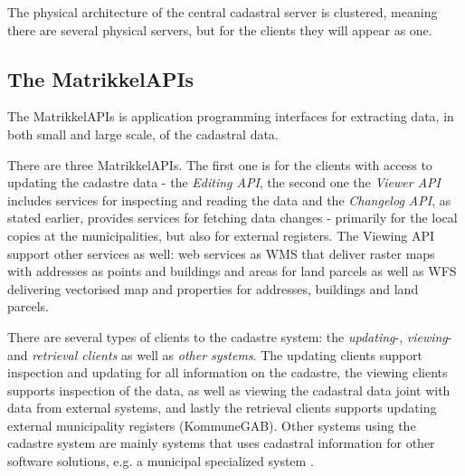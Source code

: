 The physical architecture of the central cadastral server is clustered, meaning there are several physical servers, but for the clients they will appear as one. %


\subsection{The MatrikkelAPIs} \label{matrikkelapi}
The MatrikkelAPIs is application programming interfaces for extracting data, in both small and large scale, of the cadastral data.  

There are three MatrikkelAPIs. The first one is for the clients with access to updating the cadastre data - the \textit{Editing API}, the second one the \textit{Viewer API} includes services for inspecting and reading the data and the \textit{Changelog API}, as stated earlier, provides services for fetching data changes - primarily for the local copies at the municipalities, but also for external registers.  The Viewing API support other services as well: web services as WMS that deliver raster maps with addresses as points and buildings and areas for land parcels as well as WFS delivering vectorised map	and properties for addresses, buildings and land parcels. 

There are several types of clients to the cadastre system: the \textit{updating}-, \textit{viewing}- and \textit{retrieval clients} as well as \textit{other systems}. The updating clients support inspection and updating for all information on the cadastre, the viewing clients supports inspection of the data, as well as viewing the cadastral data joint with data from external systems, and lastly the retrieval clients supports updating external municipality registers (KommuneGAB). Other systems using the cadastre system are mainly systems that uses cadastral information for other software solutions, e.g. a municipal specialized system \citep[p.~337-338]{Matrikkelavdelingen2017}.
 

